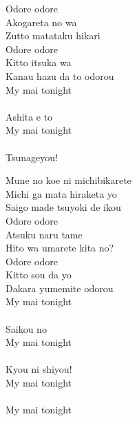 \begin{multicols}{2}
Odore odore\\
Akogareta no wa\\
Zutto matataku hikari\\
Odore odore\\
Kitto itsuka wa\\
Kanau hazu da to odorou\\

My mai tonight\\
\\
Ashita e to\\
My mai tonight\\
\\
Tsunageyou!\\


Mune no koe ni michibikarete\\
Michi ga mata hiraketa yo\\
Saigo made tsuyoki de ikou\\

Odore odore\\
Atsuku naru tame\\
Hito wa umarete kita no?\\
Odore odore\\
Kitto sou da yo\\
Dakara yumemite odorou\\

My mai tonight\\
\\
Saikou no\\
My mai tonight\\
\\
Kyou ni shiyou!\\

My mai tonight\\
\\
My mai tonight\\
\\
\end{multicols}

\ifdefined\COMPLETE
\else
	
\fi
